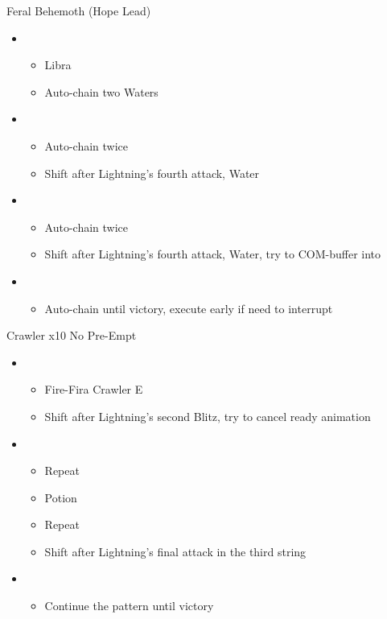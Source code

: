 \documentclass{report}
\begin{document}
\begin{battle}{Feral Behemoth (Hope Lead)}
\begin{itemize}
    \item \first
    \begin{itemize}
        \item Libra
        \item Auto-chain two Waters
    \end{itemize}
    \item \fourth
    \begin{itemize}
        \item Auto-chain twice
        \item Shift after Lightning's fourth attack, Water
    \end{itemize}
    \item \fifth
    \begin{itemize}
        \item Auto-chain twice
        \item Shift after Lightning's fourth attack, Water, try to COM-buffer into
    \end{itemize}
    \item \first
    \begin{itemize}
        \item Auto-chain until victory, execute early if need to interrupt
    \end{itemize}
\end{itemize}
\end{battle}

\begin{battle}{Crawler x10 No Pre-Empt}
\begin{itemize}
    \item \first
    \begin{itemize}
        \item Fire-Fira Crawler E
        \item Shift after Lightning's second Blitz, try to cancel ready animation
    \end{itemize}
    \item \sixth
    \begin{itemize}
        \item Repeat
        \item Potion
        \item Repeat
        \item Shift after Lightning's final attack in the third string
    \end{itemize}
    \item \first
    \begin{itemize}
        \item Continue the pattern until victory
    \end{itemize}
\end{itemize}
\end{battle}
\end{document}
